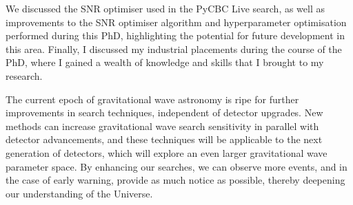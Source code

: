 We discussed the SNR optimiser used in the PyCBC Live search, as well as improvements to the SNR optimiser algorithm and hyperparameter optimisation performed during this PhD, highlighting the potential for future development in this area. Finally, I discussed my industrial placements during the course of the PhD, where I gained a wealth of knowledge and skills that I brought to my research.

The current epoch of gravitational wave astronomy is ripe for further improvements in search techniques, independent of detector upgrades. New methods can increase gravitational wave search sensitivity in parallel with detector advancements, and these techniques will be applicable to the next generation of detectors, which will explore an even larger gravitational wave parameter space. By enhancing our searches, we can observe more events, and in the case of early warning, provide as much notice as possible, thereby deepening our understanding of the Universe.

